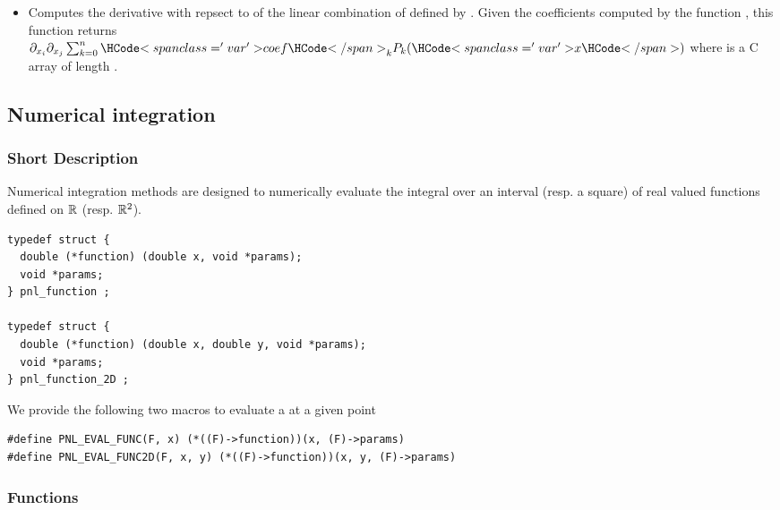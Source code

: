 \begin{itemize}
\item {}
  \sshortdescribe Computes the derivative with repsect to  of the
  linear combination of  defined by . Given the
  coefficients computed by the function , this
  function returns $\partial_{x_i} \partial_{x_j} \sum_{k=0}^n \var{coef}_k  P_k(\var{x})$
  where  is a C array of length .
\end{itemize}


\subsection{Numerical integration}
\subsubsection{Short Description}

Numerical integration methods are designed to numerically evaluate the
integral over an interval (resp. a square) of real valued functions defined on
${\mathbb R}$ (resp. ${\mathbb R}^2$).

\begin{verbatim}
typedef struct {
  double (*function) (double x, void *params);
  void *params;
} pnl_function ;

typedef struct {
  double (*function) (double x, double y, void *params);
  void *params;
} pnl_function_2D ;
\end{verbatim}

We provide the following two macros to evaluate a  at
a given point
\begin{verbatim}
#define PNL_EVAL_FUNC(F, x) (*((F)->function))(x, (F)->params)
#define PNL_EVAL_FUNC2D(F, x, y) (*((F)->function))(x, y, (F)->params)
\end{verbatim}



\subsubsection{Functions}

